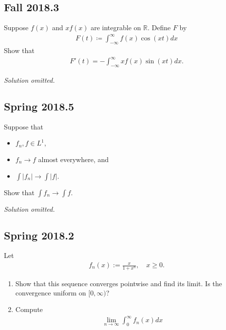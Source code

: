 \hypertarget{fall-2018.3}{%
\subsection{Fall 2018.3}\label{fall-2018.3}}

Suppose \(f(x)\) and \(xf(x)\) are integrable on \({\mathbb{R}}\).
Define \(F\) by
\begin{align*}
F(t)\coloneqq\int _{-\infty}^{\infty} f(x) \cos (x t) dx
\end{align*}
Show that
\begin{align*}
F'(t)=-\int _{-\infty}^{\infty} x f(x) \sin (x t) dx
.\end{align*}


\emph{Solution omitted.}

\hypertarget{spring-2018.5}{%
\subsection{Spring 2018.5}\label{spring-2018.5}}

Suppose that

\begin{itemize}
\tightlist
\item
  \(f_n, f \in L^1\),
\item
  \(f_n \to f\) almost everywhere, and
\item
  \(\int\left|f_{n}\right| \rightarrow \int|f|\).
\end{itemize}

Show that \(\int f_{n} \rightarrow \int f\).

\emph{Solution omitted.}

\hypertarget{spring-2018.2}{%
\subsection{Spring 2018.2}\label{spring-2018.2}}

Let
\begin{align*}
f_{n}(x):=\frac{x}{1+x^{n}}, \quad x \geq 0.
\end{align*}

\begin{enumerate}
\def\labelenumi{\alph{enumi}.}
\item
  Show that this sequence converges pointwise and find its limit. Is the
  convergence uniform on \([0, \infty)\)?
\item
  Compute
  \begin{align*}
  \lim _{n \rightarrow \infty} \int_{0}^{\infty} f_{n}(x) d x
  \end{align*}
\end{enumerate}

